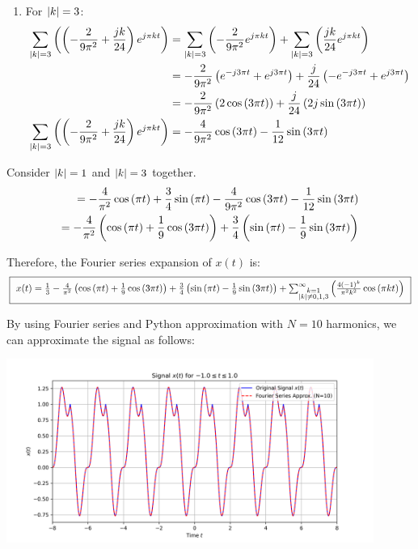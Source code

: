 \documentclass[a4paper, 10pt]{article}
\begin{document}
\begin{tosubmit}
\begin{enumerate}
    \item For \( \left| k \right| = 3 \):
    \begin{align*}
        \sum_{\left| k \right| = 3} \left( \left( -\frac{2}{9\pi^2} + \frac{jk}{24} \right) e^{ j \pi k t}\right) &= \sum_{\left| k \right| = 3} \left( -\frac{2}{9\pi^2} e^{ j \pi k t} \right) + \sum_{\left| k \right| = 3} \left( \frac{jk}{24} e^{ j \pi k t} \right) \\
        &= -\frac{2}{9\pi^2} \left( e^{-j 3\pi t} + e^{j 3\pi t} \right) + \frac{j}{24} \left( -e^{-j 3\pi t} + e^{j 3\pi t} \right) \\
        &= -\frac{2}{9\pi^2} \left( 2\cos{(3\pi t)} \right) + \frac{j}{24} \left( 2j\sin{(3\pi t)} \right) \\
        \sum_{\left| k \right| = 3} \left( \left( -\frac{2}{9\pi^2} + \frac{jk}{24} \right) e^{ j \pi k t}\right) &= -\frac{4}{9\pi^2} \cos{(3\pi t)} - \frac{1}{12} \sin{(3\pi t)}
    \end{align*}
\end{enumerate}

\newpage

Consider \( \left|k\right| = 1 \) and \( \left|k\right| = 3 \) together.
\begin{align*}
    = - \frac{4}{\pi^2} \cos{(\pi t)} + \frac{3}{4} \sin{(\pi t)} - \frac{4}{9\pi^2} \cos{(3\pi t)} - \frac{1}{12} \sin{(3\pi t)} \\
    = - \frac{4}{\pi^2} \left( \cos{(\pi t)} + \frac{1}{9} \cos{(3\pi t)} \right) + \frac{3}{4} \left( \sin{(\pi t)} - \frac{1}{9} \sin{(3\pi t)} \right)
\end{align*}


Therefore, the Fourier series expansion of \( x(t) \) is:
\[ \boxed{ \scalebox{0.90}{ \(
x(t) = \frac{1}{3} - \frac{4}{\pi^2} \paren{ \cos{(\pi t)} + \frac{1}{9} \cos{(3\pi t)} } + \frac{3}{4} \paren{ \sin{(\pi t)} - \frac{1}{9} \sin{(3\pi t)} } + \sum_{\substack{ k = 1 \\ \abs{ k } \neq 0, 1, 3 }}^{\infty} \paren{ \frac{4(-1)^{k}}{\pi^2 k^2} \cos{(\pi k t)} }
\) } } \]

By using Fourier series and Python approximation with \( N = 10 \) harmonics, we can approximate the signal as follows:
\begin{center}
    \includegraphics[width=0.9\textwidth]{images/problem_2_3.png}
\end{center}
\end{tosubmit}
\end{document}
